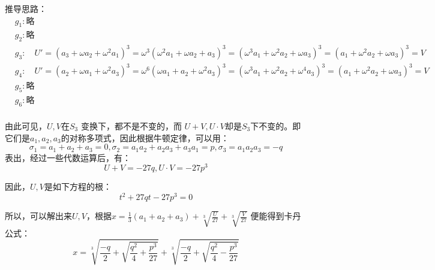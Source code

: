 \documentclass[12pt]{article}
\begin{document}
\begin{framed}  
\small{
推导思路：
\begin{align*}
    & g_1: \text{略} \\
    & g_2: \text{略} \\
    & g_3: \quad U' = (a_3+\omega a_2 + \omega^2 a_1)^3 = \omega^3 (\omega^2 a_1 + \omega a_2 + a_3)^3 = 
    (\omega^3 a_1 + \omega^2 a_2 + \omega a_3)^3 =
     (a_1 + \omega^2 a_2 + \omega a_3)^3 = V\\
     & g_4: \quad U' = (a_2+\omega a_1 + \omega^2 a_3)^3 = \omega^6 (\omega a_1 + a_2 + \omega^2a_3)^3 = 
    (\omega^3 a_1 + \omega^2 a_2 + \omega^4 a_3)^3 = (a_1 + \omega^2 a_2 + \omega a_3)^3 = V\\
    & g_5: \text{略} \\
    & g_6: \text{略} \\
\end{align*}
}
\end{framed}

由此可见，$U,V$在$S_3$ 变换下，都不是不变的，而 $U+V, U\cdot V$却是$S_3$下不变的。即它们是$a_1,a_2,a_3$的对称多项式，因此根据牛顿定律，可以用：
$$
\sigma_1 = a_1 + a_2 + a_3 = 0, \sigma_2 = a_1a_2 + a_2a_3 + a_3a_1 = p, \sigma_3 = a_1a_2a_3 = -q
$$
表出，经过一些代数运算后，有：
$$
U + V = -27q, U \cdot V = -27p^3
$$

因此，$U,V$是如下方程的根：
$$
t^2 + 27qt - 27p^3 = 0
$$

所以，可以解出来$U,V$，根据$x = \frac{1}{3}(a_1+a_2+a_3) + \sqrt[3]{\frac{U}{27}} + \sqrt[3]{\frac{V}{27}}$ 便能得到卡丹公式：
$$
x = \sqrt[3]{\frac{-q}{2} + \sqrt{\frac{q^2}{4}+ \frac{p^3}{27}}} + \sqrt[3]{\frac{-q}{2} + \sqrt{\frac{q^2}{4} - \frac{p^3}{27}}}
$$
\end{document}
